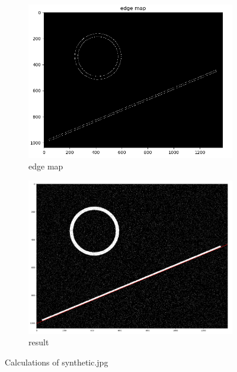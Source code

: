 \documentclass[12pt]{article}
\begin{document}
\begin{figure}[!htb]
  \centering
  \begin{subfigure}{.5\textwidth}
    \centering
    \includegraphics[width=0.95\linewidth]{pics/syntheticEdgeMap}
    \caption{edge map}
  \end{subfigure}%
  \begin{subfigure}{.5\textwidth}
    \centering
    \includegraphics[width=0.95\linewidth]{pics/synthetic}
    \caption{result}
   \end{subfigure}
  \caption{Calculations of synthetic.jpg}
\end{figure}
\end{document}
